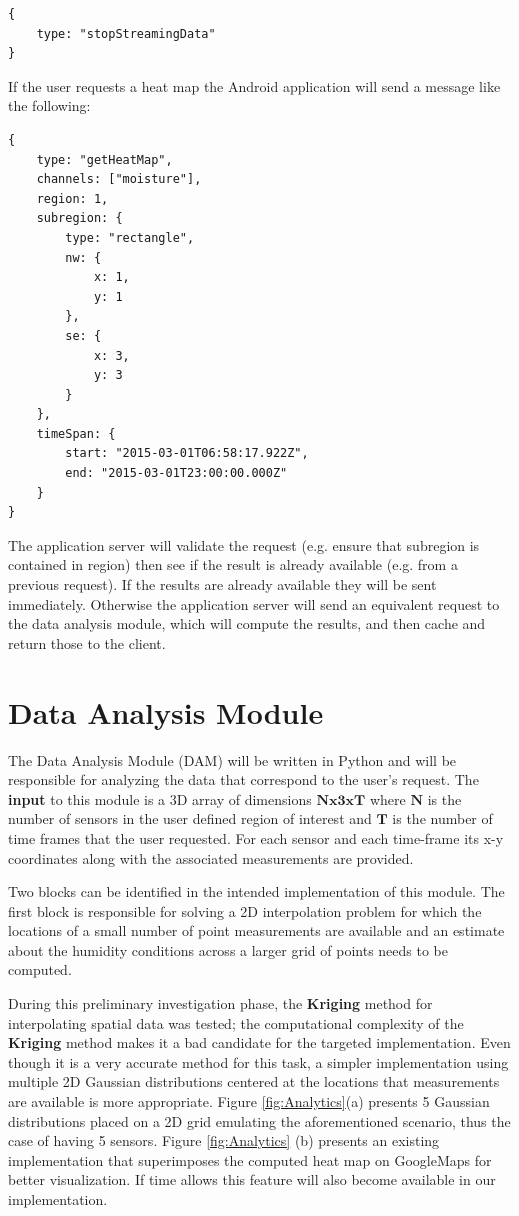 \documentclass{article}
\begin{document}
\begin{verbatim}
{
    type: "stopStreamingData"
}
\end{verbatim}

If the user requests a heat map the Android application will send a message like the following:
\begin{verbatim}
{
    type: "getHeatMap",
    channels: ["moisture"],
    region: 1,
    subregion: {
        type: "rectangle",
        nw: {
            x: 1,
            y: 1
        },
        se: {
            x: 3,
            y: 3
        }
    },
    timeSpan: {
        start: "2015-03-01T06:58:17.922Z",
        end: "2015-03-01T23:00:00.000Z"
    }
}
\end{verbatim}

The application server will validate the request (e.g. ensure that subregion is contained in region)
then see if the result is already available (e.g. from a previous request).
If the results are already available they will be sent immediately.
Otherwise the application server will send an equivalent request to the data analysis module,
which will compute the results, and then cache and return those to the client.


\section{Data Analysis Module}

The Data Analysis Module (DAM) will be written in Python and will be responsible for analyzing the data that correspond to the user's request. The \textbf{input} to this module is a 3D array of dimensions $\mathbf{Nx3xT}$ where $\mathbf{N}$ is the number of sensors in the user defined region of interest and $\mathbf{T}$ is the number of time frames that the user requested. For each sensor and each time-frame its x-y coordinates along with the associated measurements are provided.

Two blocks can be identified in the intended implementation of this module. The first block is responsible for solving a 2D interpolation problem for which the locations of a small number of point measurements are available and an estimate about the humidity conditions across a larger grid of points needs to be computed. 

During this preliminary investigation phase, the \textbf{Kriging} method for interpolating spatial data was tested; the computational complexity of the \textbf{Kriging} method makes it a bad candidate for the targeted implementation. Even though it is a very accurate method for this task, a simpler implementation using multiple 2D Gaussian distributions centered at the locations that measurements are available is more appropriate. Figure \ref{fig:Analytics}(a)
presents 5 Gaussian distributions placed on a 2D grid emulating the aforementioned scenario, thus the case of having 5 sensors. Figure \ref{fig:Analytics} (b) presents an existing implementation that superimposes the computed heat map on GoogleMaps for better visualization. If time allows this feature will also become available in our implementation. 
\end{document}
